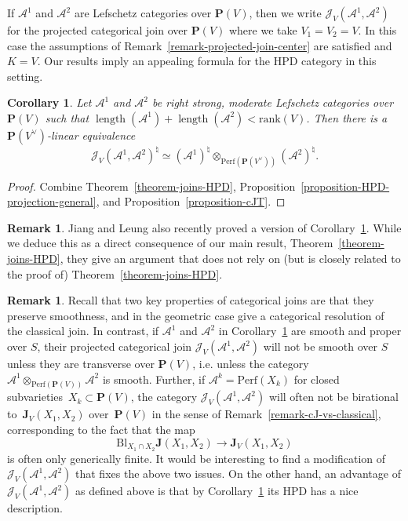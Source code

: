 \documentclass[11pt, reqno]{amsart}
\numberwithin{equation}{section}
\theoremstyle{plain}
\newtheorem{corollary}[theorem]{Corollary}
\theoremstyle{definition}
\newtheorem{remark}[theorem]{Remark}
\newcommand{\Perf}{\mathrm{Perf}}
\DeclareMathOperator{\length}{\mathrm{length}}
\newcommand{\hpd}{{\natural}}
\newcommand{\svee}{\scriptscriptstyle\vee}
\newcommand{\Bl}{\mathrm{Bl}}
\newcommand{\vV}{V^{\svee}}
\newcommand{\rank}{\mathrm{rank}}
\newcommand{\cA}{\mathcal{A}}
\newcommand{\cJ}{\mathcal{J}}
\newcommand{\bJ}{\mathbf{J}}
\newcommand{\bP}{\mathbf{P}}
\begin{document}
If $\cA^1$ and $\cA^2$ are Lefschetz categories over $\bP(V)$, then we write 
$\cJ_V(\cA^1, \cA^2)$ for the projected categorical join over $\bP(V)$ where we 
take $V_1 = V_2 = V$. 
In this case the assumptions of Remark~\ref{remark-projected-join-center} are satisfied and $K = V$.
Our results imply an appealing formula for the HPD category in this setting.

\begin{corollary}
\label{corollary-relative-joins} 
Let $\cA^1$ and $\cA^2$ be right strong, moderate Lefschetz categories over 
$\bP(V)$ such that $\length(\cA^1) + \length(\cA^2) < \rank(V)$. 
Then there is a $\bP(\vV)$-linear equivalence 
\begin{equation*}
\cJ_V(\cA^1, \cA^2)^{\hpd} \simeq (\cA^1)^{\hpd} \otimes_{\Perf(\bP(\vV))} (\cA^2)^{\hpd}. 
\end{equation*} 
\end{corollary}

\begin{proof}
Combine Theorem~\ref{theorem-joins-HPD}, Proposition~\ref{proposition-HPD-projection-general}, 
and Proposition~\ref{proposition-cJT}. 
\end{proof}

\begin{remark}
Jiang and Leung \cite{jiang-leung-joins} also recently proved a version of Corollary~\ref{corollary-relative-joins}. 
While we deduce this as a direct consequence of our main result, Theorem~\ref{theorem-joins-HPD}, 
they give an argument that does not rely on (but is closely related to the proof of) 
Theorem~\ref{theorem-joins-HPD}. 
\end{remark}

\begin{remark}
\label{remark-cJv-problems}
Recall that two key properties of categorical joins are that they preserve smoothness, and in the geometric case give a categorical resolution of the classical join. 
In contrast, if $\cA^1$ and $\cA^2$ in Corollary~\ref{corollary-relative-joins} are smooth and proper over $S$, 
their projected categorical join $\cJ_V(\cA^1, \cA^2)$ will not be smooth over $S$ unless they are transverse over $\bP(V)$, 
i.e. unless the category~$\cA^1 \otimes_{\Perf(\bP(V))} \cA^2$ is smooth. 
Further, if {$\cA^k = \Perf(X_k)$} for closed 
subvarieties~\mbox{$X_k \subset \bP(V)$}, 
the category $\cJ_V(\cA^1, \cA^2)$ will often not be 
birational to~$\bJ_V(X_1, X_2)$ over~$\bP(V)$ in the sense 
of Remark~\ref{remark-cJ-vs-classical}, 
corresponding to the fact that 
the map 
\begin{equation*}
\Bl_{X_{1} \cap X_{2}} \bJ(X_1, X_2) \to \bJ_V(X_1, X_2) 
\end{equation*}
is often only generically finite. 
It would be interesting to find a modification of~$\cJ_V(\cA^1, \cA^2)$ that fixes the above two issues. 
On the other hand, an advantage of $\cJ_V(\cA^1,\cA^2)$ as defined above is that 
by Corollary~\ref{corollary-relative-joins}  its HPD has a nice description. 
\end{remark}
\end{document}
